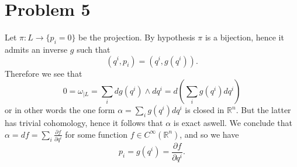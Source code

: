 \documentclass[]{article}
\newcommand{\D}[2]{\frac{\partial #1}{\partial #2}}
\begin{document}
\section{Problem 5}

Let $\pi:L\to \{p_i=0\}$ be the projection. By hypothesis $\pi$ is a bijection, hence it admits an inverse $g$ such that 
$$ (q^i,p_i) = (q^i,g(q^i)). $$ 
Therefore we see that $$ 0=\omega_{|L} = \sum_i dg(q^i)\wedge dq^i = d(\sum_i g(q^i)dq^i) $$ or in other words the one form $\alpha = \sum_i g(q^i)dq^i $ is closed in $\mathbb{R}^n$. But the latter has trivial cohomology, hence it follows that $\alpha$ is exact aswell. We conclude that $ \alpha = df =\sum_i \D{f}{q^i} $ for some function $f \in C^{\infty}(\mathbb{R}^n)$, and so we have $$ p_i = g(q^i) = \D{f}{q^i}. $$
\end{document}

